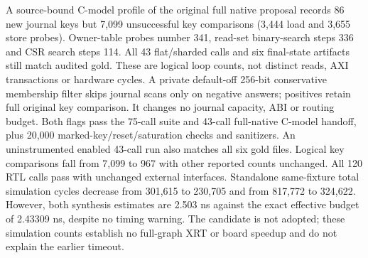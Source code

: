\documentclass[10pt]{article}
\begin{document}
A source-bound C-model profile of the original full native proposal
records 86 new journal keys but 7,099 unsuccessful key comparisons
(3,444 load and 3,655 store probes). Owner-table probes number 341,
read-set binary-search steps 336 and CSR search steps 114. All 43
flat/sharded calls and six final-state artifacts still match audited gold.
These are logical loop counts, not distinct reads, AXI transactions or
hardware cycles.
A private default-off 256-bit conservative membership filter skips
journal scans only on negative answers; positives retain full original
key comparison. It changes no journal capacity, ABI or routing budget.
Both flags pass the 75-call suite and 43-call full-native C-model
handoff, plus 20,000 marked-key/reset/saturation checks and sanitizers.
An uninstrumented enabled 43-call run also matches all six gold files.
Logical key comparisons fall from 7,099 to 967 with other reported
counts unchanged. All 120 RTL calls pass with unchanged external
interfaces. Standalone same-fixture total simulation cycles decrease
from 301,615 to 230,705 and from 817,772 to 324,622. However, both
synthesis estimates are 2.503 ns against the exact effective budget
of 2.43309 ns, despite no timing warning. The candidate is not adopted;
these simulation counts establish no full-graph XRT or board speedup
and do not explain the earlier timeout.
\end{document}
